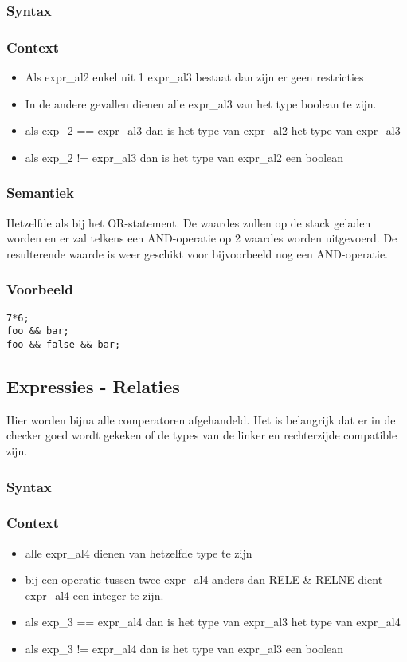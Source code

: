 \documentclass[]{article}
\begin{document}
\subsubsection{Syntax}

\subsubsection{Context}
\begin{itemize}
\item Als expr\_al2 enkel uit 1 expr\_al3 bestaat dan zijn er geen restricties
\item In de andere gevallen dienen alle expr\_al3 van het type boolean te zijn.
\item als exp\_2 == expr\_al3 dan is het type van expr\_al2 het type van expr\_al3
\item als exp\_2 != expr\_al3 dan is het type van expr\_al2 een boolean
\end{itemize}
\subsubsection{Semantiek}
Hetzelfde als bij het OR-statement. De waardes zullen op de stack geladen worden en er zal telkens een AND-operatie op 2 waardes worden uitgevoerd. De resulterende waarde is weer geschikt voor bijvoorbeeld nog een AND-operatie.
\subsubsection{Voorbeeld}
\begin{lstlisting}[style=SELMA]
7*6;
foo && bar;
foo && false && bar;
\end{lstlisting}

\subsection{Expressies - Relaties}
Hier worden bijna alle comperatoren afgehandeld. Het is belangrijk dat er in de checker goed wordt gekeken of de types van de linker en rechterzijde compatible zijn.
\subsubsection{Syntax}

\subsubsection{Context}
\begin{itemize}
\item alle expr\_al4 dienen van hetzelfde type te zijn
\item bij een operatie tussen twee expr\_al4 anders dan RELE \& RELNE dient expr\_al4 een integer te zijn.
\item als exp\_3 == expr\_al4 dan is het type van expr\_al3 het type van expr\_al4
\item als exp\_3 != expr\_al4 dan is het type van expr\_al3 een boolean
\end{itemize}
\end{document}
